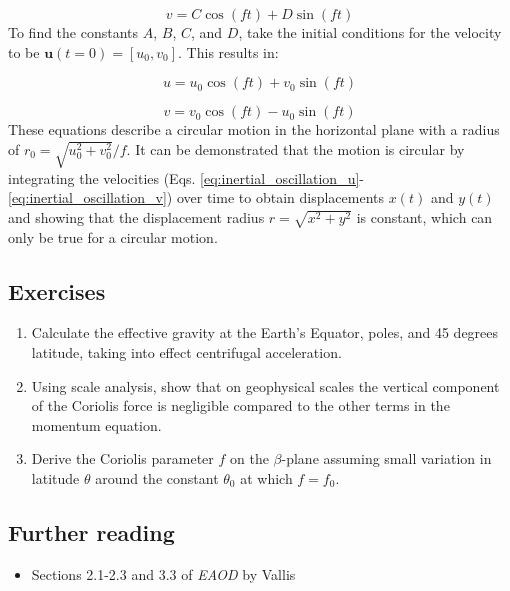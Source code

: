 \documentclass[12pt]{article}
\numberwithin{equation}{section}
\numberwithin{figure}{section}
\numberwithin{table}{section}
\begin{document}
\begin{equation}
  v = C \cos(f t) + D \sin(f t)
\end{equation}
To find the constants $A$, $B$, $C$, and $D$, take the initial conditions for
the velocity to be $\mathbf{u}(t=0) = [u_0, v_0]$.
This results in:

\begin{equation}
  u = u_0 \cos(f t) + v_0 \sin(f t)
  \label{eq:inertial_oscillation_u}
\end{equation}

\begin{equation}
  v = v_0 \cos(f t) - u_0 \sin(f t)
  \label{eq:inertial_oscillation_v}
\end{equation}
These equations describe a circular motion in the horizontal plane with a radius
of $r_0 = \sqrt{u_0^2 + v_0^2} / f$.
It can be demonstrated that the motion is circular by integrating the velocities
(Eqs. \ref{eq:inertial_oscillation_u}-\ref{eq:inertial_oscillation_v}) over time
to obtain displacements $x(t)$ and $y(t)$ and showing that the displacement
radius $r = \sqrt{x^2 + y^2}$ is constant, which can only be true for a circular
motion.

\subsection{Exercises}

\begin{enumerate}
  \item Calculate the effective gravity at the Earth's Equator, poles, and 45 degrees
  latitude, taking into effect centrifugal acceleration.
  \item Using scale analysis, show that on geophysical scales the vertical
  component of the Coriolis force is negligible compared to the other terms
  in the momentum equation.
  \item Derive the Coriolis parameter $f$ on the $\beta$-plane assuming small
  variation in latitude $\theta$ around the constant $\theta_0$ at which $f = f_0$.
\end{enumerate}

\subsection*{Further reading}

\begin{itemize}
  \item Sections 2.1-2.3 and 3.3 of \textit{EAOD} by Vallis
\end{itemize}
\end{document}
